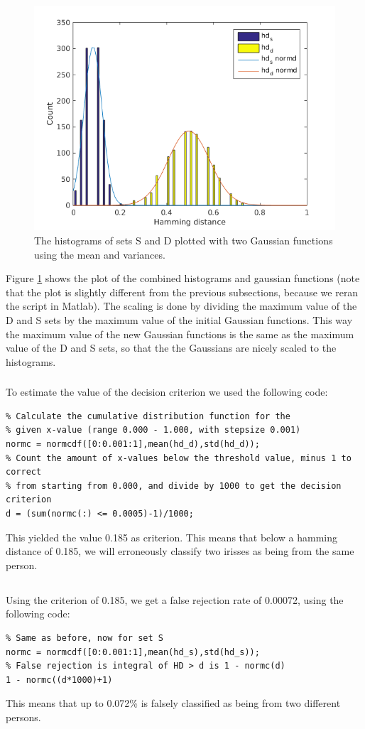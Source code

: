 \documentclass[10pt]{article}
\begin{document}
\begin{figure}[H]
	\centering
	\includegraphics[width=.7\linewidth]{2_6.png}
	\caption{The histograms of sets S and D plotted with two Gaussian functions using the mean and variances.}
	\label{fig2.6}
\end{figure}
Figure \ref{fig2.6} shows the plot of the combined histograms and gaussian functions (note that the plot is slightly different from the previous subsections, because we reran the script in Matlab). The scaling is done by dividing the maximum value of the D and S sets by the maximum value of the initial Gaussian functions. This way the maximum value of the new Gaussian functions is the same as the maximum value of the D and S sets, so that the the Gaussians are nicely scaled to the histograms.

\subsubsection{}
To estimate the value of the decision criterion we used the following code:
\begin{lstlisting}
% Calculate the cumulative distribution function for the 
% given x-value (range 0.000 - 1.000, with stepsize 0.001)
normc = normcdf([0:0.001:1],mean(hd_d),std(hd_d));
% Count the amount of x-values below the threshold value, minus 1 to correct 
% from starting from 0.000, and divide by 1000 to get the decision criterion
d = (sum(normc(:) <= 0.0005)-1)/1000;
\end{lstlisting}
This yielded the value 0.185 as criterion. This means that below a hamming distance of 0.185, we will erroneously classify two irisses as being from the same person.

\subsection{}
Using the criterion of 0.185, we get a false rejection rate of 0.00072, using the following code:
\begin{lstlisting}
% Same as before, now for set S
normc = normcdf([0:0.001:1],mean(hd_s),std(hd_s));
% False rejection is integral of HD > d is 1 - normc(d)
1 - normc((d*1000)+1)
\end{lstlisting}
This means that up to 0.072\% is falsely classified as being from two different persons.
\end{document}
